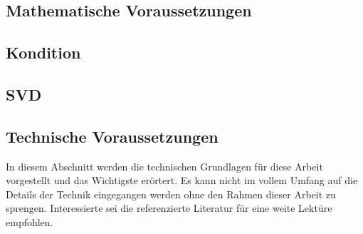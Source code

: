 \subsection[mathematisches]{Mathematische Voraussetzungen}
%
\subsection{Kondition}

\subsection{SVD}

%
\subsection[technisches]{Technische Voraussetzungen}
In diesem Abschnitt werden die technischen Grundlagen für diese Arbeit vorgestellt und das Wichtigste erörtert. Es kann nicht im vollem Umfang auf die Details der Technik eingegangen werden ohne den Rahmen dieser Arbeit zu sprengen. Interessierte sei die referenzierte Literatur für eine weite Lektüre empfohlen.
%
